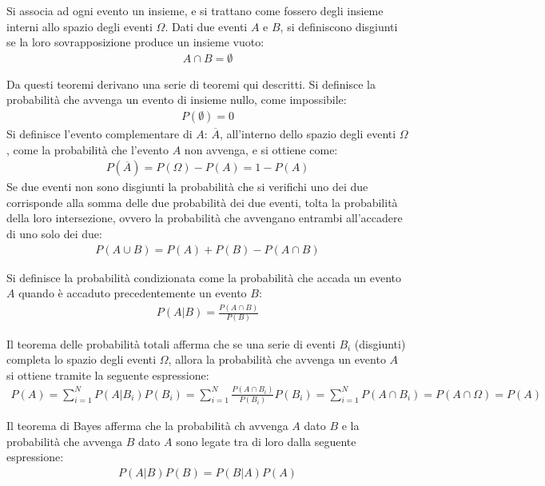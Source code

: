\documentclass{article}
\numberwithin{equation}{subsection}
\begin{document}
Si associa ad ogni evento un insieme, e si trattano come fossero degli insieme interni allo spazio degli eventi $\Omega$. Dati due eventi $A$ e $B$, si definiscono disgiunti se la loro 
sovrapposizione produce un insieme vuoto:
\begin{gather*}
    A\cap B=\emptyset
\end{gather*}


Da questi teoremi derivano una serie di teoremi qui descritti. Si definisce la probabilità che avvenga un evento di insieme nullo, come impossibile:
\begin{gather*}
    P(\emptyset)=0
\end{gather*}
Si definisce l'evento complementare di $A$: $\overline{A}$, all'interno dello spazio degli eventi $\Omega$, come la probabilità che l'evento $A$ non avvenga, e si ottiene come:
\begin{gather*}
    P(\overline{A})=P(\Omega)-P(A)=1-P(A)
\end{gather*}
Se due eventi non sono disgiunti la probabilità che si verifichi uno dei due corrisponde alla somma delle due probabilità dei due eventi, tolta la probabilità della loro 
intersezione, ovvero la probabilità che avvengano entrambi all'accadere di uno solo dei due: 
\begin{gather*}
    P(A\cup B)=P(A)+P(B)-P(A\cap B)
\end{gather*}


Si definisce la probabilità condizionata come la probabilità che accada un evento $A$ quando è accaduto precedentemente un evento $B$:
\begin{gather*}
    P(A|B)=\displaystyle\frac{P(A\cap B)}{P(B)}
\end{gather*} 


Il teorema delle probabilità totali afferma che se una serie di eventi $B_i$ (disgiunti) completa lo spazio degli eventi $\Omega$, allora la probabilità 
che avvenga un evento $A$ si ottiene tramite la seguente espressione: 
\begin{gather*}
    P(A)=\displaystyle\sum_{i=1}^NP(A|B_i)P(B_i)=\sum_{i=1}^N\frac{P(A\cap B_i)}{P(B_i)}P(B_i)=\sum_{i=1}^NP(A\cap B_i)=P(A\cap \Omega)=P(A)
\end{gather*}

Il teorema di Bayes afferma che la probabilità ch avvenga $A$ dato $B$ e la probabilità che avvenga $B$ dato $A$ sono legate tra di loro dalla seguente espressione:
\begin{gather*}
    P(A|B)P(B)=P(B|A)P(A)
\end{gather*}
\end{document}
